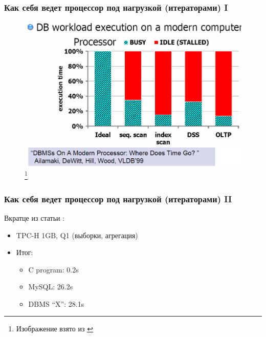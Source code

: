 \documentclass{beamer}
\begin{document}
\begin{frame}
\frametitle{Как себя ведет процессор под нагрузкой (итераторами) I}

\begin{figure}[htb]
\includegraphics[width=\textwidth,height=0.750\textheight,keepaspectratio]{analysis.png} 
\footnote{\tiny{Изображение взято из \cite{Harizopoulos2009}}}
\end{figure}
  
\end{frame}

\begin{frame}
\frametitle{Как себя ведет процессор под нагрузкой (итераторами) II}

Вкратце из статьи \cite{Boncz2005}:

\begin{itemize}
  \setlength\itemsep{1em}
  \item TPC-H 1GB, Q1 (выборки, агрегация)
  \item Итог:
  \begin{itemize}
    \setlength\itemsep{1em}
    \item C program: 0.2s
    \item MySQL: 26.2s
    \item DBMS ``X'': 28.1s
  \end{itemize}
\end{itemize}
  
\end{frame}
\end{document}
